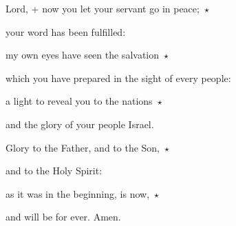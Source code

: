\noindent Lord, + now you let your servant go in peace;~$\star$~\nopagebreak

your word has been fulfilled:

\noindent my own eyes have seen the salvation~$\star$~\nopagebreak

which you have prepared in the sight of every people:

\noindent a light to reveal you to the nations~$\star$~\nopagebreak

and the glory of your people Israel.

\noindent Glory to the Father, and to the Son,~$\star$~\nopagebreak

and to the Holy Spirit:

\noindent as it was in the beginning, is now,~$\star$~\nopagebreak

and will be for ever. Amen.

